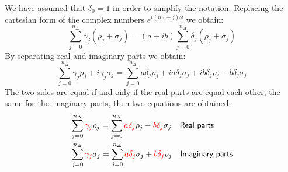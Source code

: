 We have assumed that $\delta_0=1$ in order to simplify the notation. Replacing the cartesian form of the complex numbers $e^{i(n_\Delta-j)\omega}$ we obtain: 
\begin{equation}
    \sum_{j=0}^{n_\Delta} \gamma_j (\rho_j+\sigma_j) = (a+ib)
    \sum_{j=0}^{n_\Delta} \delta_j (\rho_j+\sigma_j)
\end{equation}
\noindent
By separating real and imaginary parts we obtain:
\begin{equation}
    \sum_{j=0}^{n_\Delta} \gamma_j \rho_j + i \gamma_j\sigma_j = 
    \sum_{j=0}^{n_\Delta}{
        a \delta_j \rho_j + i a \delta_j \sigma_j + i  b \delta_j \rho_j - b \delta_j \sigma_j
    }
\end{equation}
The two sides are equal if and only if the real parts are equal each other, the same for the imaginary parts, then two equations are obtained: 
\begin{align}
    &\sum_{j=0}^{n_\Delta} {\color{red}\gamma_j} \rho_j= \sum_{j=0}^{n_\Delta}{
         {\color{red}a\delta_j} \rho_j  -  {\color{red}b\delta_j} \sigma_j 
    } \quad \textsf{Real parts}\label{eq:real}\\ 
    &\sum_{j=0}^{n_\Delta} {\color{red}\gamma_j} \sigma_j= \sum_{j=0}^{n_\Delta}{
        {\color{red}a \delta_j} \sigma_j  + {\color{red}b \delta_j} \rho_j 
    } \quad \textsf{Imaginary parts}\label{eq:img}
\end{align}

